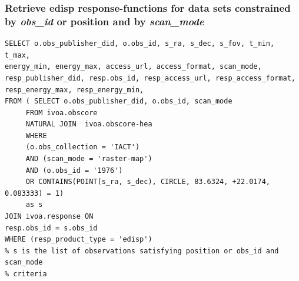 \subsubsection*{Retrieve {\bf edisp} {\bf response-function}s for data sets constrained by {\em obs\_id} or position and by {\em scan\_mode}}
{\small
\begin{verbatim}
SELECT o.obs_publisher_did, o.obs_id, s_ra, s_dec, s_fov, t_min, t_max, 
energy_min, energy_max, access_url, access_format, scan_mode,
resp_publisher_did, resp.obs_id, resp_access_url, resp_access_format, 
resp_energy_max, resp_energy_min, 
FROM ( SELECT o.obs_publisher_did, o.obs_id, scan_mode 
     FROM ivoa.obscore 
     NATURAL JOIN  ivoa.obscore-hea  
     WHERE
     (o.obs_collection = 'IACT') 
     AND (scan_mode = 'raster-map')
     AND (o.obs_id = '1976')
     OR CONTAINS(POINT(s_ra, s_dec), CIRCLE, 83.6324, +22.0174, 0.083333) = 1)
     as s
JOIN ivoa.response ON 
resp.obs_id = s.obs_id
WHERE (resp_product_type = 'edisp')
% s is the list of observations satisfying position or obs_id and scan_mode
% criteria
\end{verbatim}
}%



